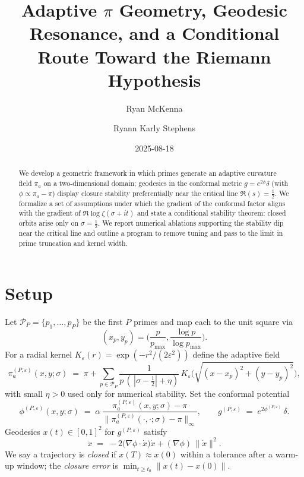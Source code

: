 \documentclass[11pt]{article}
\title{Adaptive $\pi$ Geometry, Geodesic Resonance, and a Conditional Route Toward the Riemann Hypothesis}
\author{Ryan McKenna \and Ryann Karly Stephens}
\date{2025-08-18}
\begin{document}
\maketitle

\begin{abstract}
We develop a geometric framework in which primes generate an adaptive curvature field $\pi_a$ on a two-dimensional domain; geodesics in the conformal metric $g=e^{2\phi}\delta$ (with $\phi \propto \pi_a-\pi$) display closure stability preferentially near the critical line $\Re(s)=\tfrac12$. We formalize a set of assumptions under which the gradient of the conformal factor aligns with the gradient of $\Re\log\zeta(\sigma+it)$ and state a conditional stability theorem: closed orbits arise only on $\sigma=\tfrac12$. We report numerical ablations supporting the stability dip near the critical line and outline a program to remove tuning and pass to the limit in prime truncation and kernel width.
\end{abstract}

\section{Setup}
Let $\mathcal{P}_P=\{p_1,\dots,p_P\}$ be the first $P$ primes and map each to the unit square via
\begin{equation}
(x_p,y_p) = \Big(\frac{p}{p_{\max}}, \frac{\log p}{\log p_{\max}}\Big).
\end{equation}
For a radial kernel $K_\varepsilon(r)=\exp(-r^2/(2\varepsilon^2))$ define the adaptive field
\begin{equation}
\pi_a^{(P,\varepsilon)}(x,y;\sigma) \;=\; \pi + \sum_{p\in \mathcal{P}_P} \frac{1}{p\,(\,|\sigma-\tfrac12|+\eta)}\, K_\varepsilon\!\Big(\sqrt{(x-x_p)^2 + (y-y_p)^2}\Big),
\end{equation}
with small $\eta>0$ used only for numerical stability. Set the conformal potential
\begin{equation}
\phi^{(P,\varepsilon)}(x,y;\sigma) \;=\; \alpha\,\frac{\pi_a^{(P,\varepsilon)}(x,y;\sigma)-\pi}{\|\pi_a^{(P,\varepsilon)}(\cdot,\cdot;\sigma)-\pi\|_{\infty}},
\qquad g^{(P,\varepsilon)} \;=\; e^{2\phi^{(P,\varepsilon)}}\,\delta.
\end{equation}
Geodesics $x(t)\in[0,1]^2$ for $g^{(P,\varepsilon)}$ satisfy
\begin{equation}
\ddot x \;=\; -2\big(\nabla\phi\cdot \dot x\big)\dot x + (\nabla\phi)\,\|\dot x\|^2.
\end{equation}
We say a trajectory is \emph{closed} if $x(T)\approx x(0)$ within a tolerance after a warm-up window; the \emph{closure error} is $\min_{t\ge t_0}\|x(t)-x(0)\|$.
\end{document}
